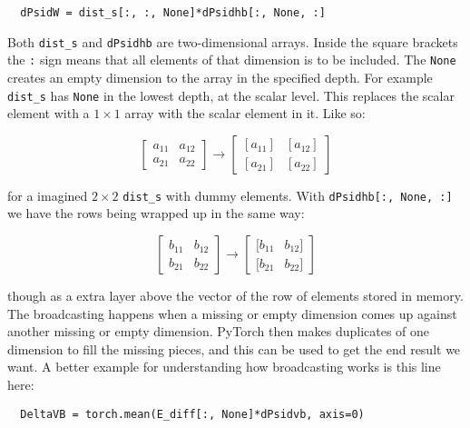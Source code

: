 \begin{verbatim}
  dPsidW = dist_s[:, :, None]*dPsidhb[:, None, :]
\end{verbatim}

Both \texttt{dist_s} and \texttt{dPsidhb} are two-dimensional arrays. Inside the square brackets the \texttt{:} sign means that all elements of that dimension is to be included. The \texttt{None} creates an empty dimension to the array in the specified depth. For example \texttt{dist_s} has \texttt{None} in the lowest depth, at the scalar level. This replaces the scalar element with a $1 \times 1$ array with the scalar element in it. Like so:

$$\begin{bmatrix}
    a_{11} & a_{12} \\

    a_{21} & a_{22}
  \end{bmatrix} \rightarrow \begin{bmatrix}
      [a_{11}] & [a_{12}] \\

     [a_{21}] & [a_{22}]
  \end{bmatrix}$$

for a imagined $2 \times 2$ \texttt{dist_s} with dummy elements. With \texttt{dPsidhb[:, None, :]} we have the rows being wrapped up in the same way:


$$\begin{bmatrix}
    b_{11} & b_{12} \\

    b_{21} & b_{22}
  \end{bmatrix} \rightarrow \begin{bmatrix}
     [b_{11} & b_{12}]  \\

    [b_{21} & b_{22}]
  \end{bmatrix}$$

though as a extra layer above the vector of the row of elements stored in memory. The broadcasting happens when a missing or empty dimension comes up against another missing or empty dimension. PyTorch then makes duplicates of one dimension to fill the missing pieces, and this can be used to get the end result we want. A better example for understanding how broadcasting works is this line here:

\begin{verbatim}
  DeltaVB = torch.mean(E_diff[:, None]*dPsidvb, axis=0)
\end{verbatim}

